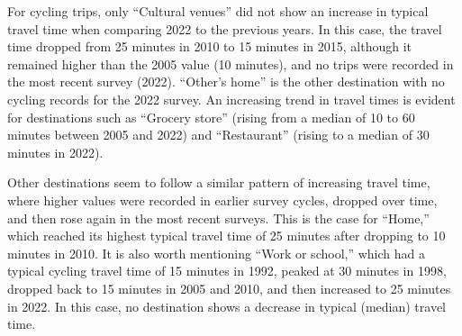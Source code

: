 \documentclass[preprint, 3p,
authoryear]{elsarticle} %
\begin{document}
For cycling trips, only ``Cultural venues'' did not show an increase in
typical travel time when comparing 2022 to the previous years. In this
case, the travel time dropped from 25 minutes in 2010 to 15 minutes in
2015, although it remained higher than the 2005 value (10 minutes), and
no trips were recorded in the most recent survey (2022). ``Other's
home'' is the other destination with no cycling records for the 2022
survey. An increasing trend in travel times is evident for destinations
such as ``Grocery store'' (rising from a median of 10 to 60 minutes
between 2005 and 2022) and ``Restaurant'' (rising to a median of 30
minutes in 2022).

Other destinations seem to follow a similar pattern of increasing travel
time, where higher values were recorded in earlier survey cycles,
dropped over time, and then rose again in the most recent surveys. This
is the case for ``Home,'' which reached its highest typical travel time
of 25 minutes after dropping to 10 minutes in 2010. It is also worth
mentioning ``Work or school,'' which had a typical cycling travel time
of 15 minutes in 1992, peaked at 30 minutes in 1998, dropped back to 15
minutes in 2005 and 2010, and then increased to 25 minutes in 2022. In
this case, no destination shows a decrease in typical (median) travel
time.
\end{document}
